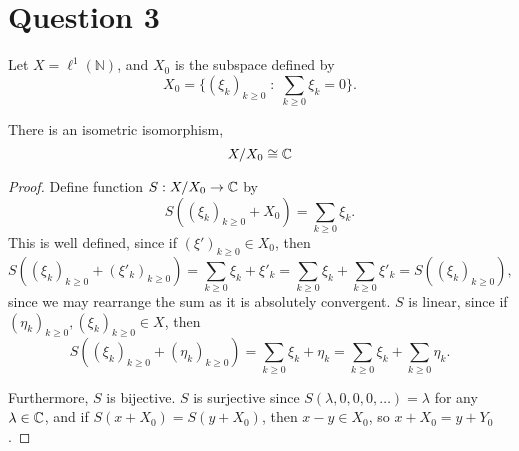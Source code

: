 \documentclass{unswmaths}
\begin{document}
\section*{Question 3}
Let $X = \ell^1(\mathbb{N})$, and $X_0$ is the subspace defined by
\begin{equation*}
    X_0 = \{ (\xi_k)_{k\geq 0} \;:\;\sum_{k\geq 0} \xi_k = 0\}.
\end{equation*}
\begin{theorem}
    There is an isometric isomorphism,
    \begin{equation*}
        X/X_0 \cong \mathbb{C}
    \end{equation*}
\end{theorem}
\begin{proof}
    Define function $S:X/X_0\rightarrow \mathbb{C}$ by
    \begin{equation*}
        S((\xi_k)_{k\geq 0}+X_0) = \sum_{k\geq 0} \xi_k.
    \end{equation*}
    This is well defined, since if $(\xi')_{k\geq 0} \in X_0$, then 
    \begin{equation*}
        S((\xi_k)_{k\geq 0}+(\xi'_k)_{k\geq 0}) = \sum_{k\geq 0} \xi_k+\xi'_k = \sum_{k\geq 0}\xi_k + \sum_{k\geq 0}\xi'_k = S((\xi_k)_{k\geq 0}),
    \end{equation*}
    since we may rearrange the sum as it is absolutely convergent. $S$ is linear, since if $(\eta_k)_{k\geq0},(\xi_k)_{k\geq0} \in X$, then
    \begin{equation*}
        S((\xi_k)_{k\geq 0}+(\eta_k)_{k\geq 0}) = \sum_{k\geq 0} \xi_k+\eta_k = \sum_{k\geq 0}\xi_k + \sum_{k\geq 0} \eta_k.
    \end{equation*}
    
    Furthermore, $S$ is bijective. $S$ is surjective since $S(\lambda,0,0,0,\ldots) = \lambda$ for any $\lambda \in \mathbb{C}$,
    and if $S(x+X_0) = S(y+X_0)$, then $x-y \in X_0$, so $x+X_0 = y+Y_0$. 
    
    
    
     
    
\end{proof}
\end{document}
